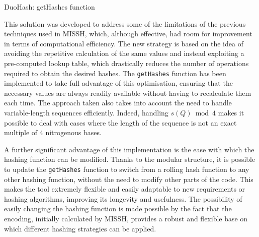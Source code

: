 \begin{algorithm}[!ht]
	\caption{DuoHash: getHashes function}
	\label{alg:DuoHash_getHashes}
	
\end{algorithm}

This solution was developed to address some of the limitations of the previous techniques used in \acs{MISSH}, which, although effective, had room for improvement in terms of computational efficiency. The new strategy is based on the idea of avoiding the repetitive calculation of the same values and instead exploiting a pre-computed lookup table, which drastically reduces the number of operations required to obtain the desired hashes. The \verb|getHashes| function has been implemented to take full advantage of this optimisation, ensuring that the necessary values are always readily available without having to recalculate them each time. The approach taken also takes into account the need to handle variable-length sequences efficiently. Indeed, handling $s(Q) \bmod 4$ makes it possible to deal with cases where the length of the sequence is not an exact multiple of 4 nitrogenous bases.

A further significant advantage of this implementation is the ease with which the hashing function can be modified. Thanks to the modular structure, it is possible to update the \verb|getHashes| function to switch from a rolling hash function to any other hashing function, without the need to modify other parts of the code. This makes the tool extremely flexible and easily adaptable to new requirements or hashing algorithms, improving its longevity and usefulness. The possibility of easily changing the hashing function is made possible by the fact that the encoding, initially calculated by \acs{MISSH}, provides a robust and flexible base on which different hashing strategies can be applied.

